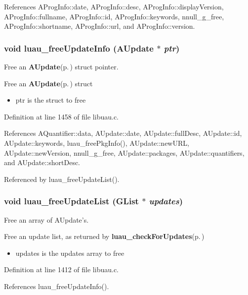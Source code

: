 References AProg\-Info::date, AProg\-Info::desc, AProg\-Info::display\-Version, AProg\-Info::fullname, AProg\-Info::id, AProg\-Info::keywords, nnull\_\-g\_\-free, AProg\-Info::shortname, AProg\-Info::url, and AProg\-Info::version.
\subsubsection{\setlength{\rightskip}{0pt plus 5cm}void luau\_\-free\-Update\-Info ({\bf AUpdate} $\ast$ {\em ptr})}\label{libuau_8c_a52}


Free an {\bf AUpdate}{\rm (p.\,\pageref{structAUpdate})} struct pointer. 

Free an {\bf AUpdate}{\rm (p.\,\pageref{structAUpdate})} struct

\begin{itemize}
\item ptr is the struct to free \end{itemize}


Definition at line 1458 of file libuau.c.

References AQuantifier::data, AUpdate::date, AUpdate::full\-Desc, AUpdate::id, AUpdate::keywords, luau\_\-free\-Pkg\-Info(), AUpdate::new\-URL, AUpdate::new\-Version, nnull\_\-g\_\-free, AUpdate::packages, AUpdate::quantifiers, and AUpdate::short\-Desc.

Referenced by luau\_\-free\-Update\-List().
\subsubsection{\setlength{\rightskip}{0pt plus 5cm}void luau\_\-free\-Update\-List (GList $\ast$ {\em updates})}\label{libuau_8c_a50}


Free an array of AUpdate's. 

Free an update list, as returned by {\bf luau\_\-check\-For\-Updates}{\rm (p.\,\pageref{libuau_8h_a53})}

\begin{itemize}
\item updates is the updates array to free \end{itemize}


Definition at line 1412 of file libuau.c.

References luau\_\-free\-Update\-Info().

